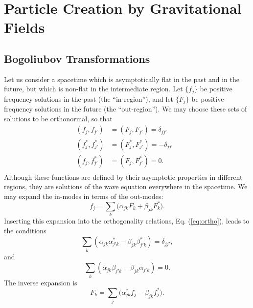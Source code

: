 \documentclass[12pt,onecolumn,eqsecnum,floats,aps,prd,floatfix,titlepage]{revtex4-2}
\begin{document}
\section{Particle Creation by Gravitational Fields}
\label{sec:particle-creation}


\subsection{Bogoliubov Transformations}
\label{sec:Bogoliubov}

    Let us consider a spacetime which is asymptotically flat in the past
and in the future, but which is non-flat in the intermediate region.
Let $\{ f_j \}$ be positive frequency solutions in the past (the 
``in-region''), and let $\{ F_j \}$ be positive frequency solutions in 
the future (the ``out-region'').  We may choose these sets of solutions
to be orthonormal, so that
\begin{equation}
\begin{aligned}
(f_j,f_{j'})&= (F_{j},F_{j'})=\delta _{jj'}& \\
(f_j^*,f_{j'}^*)& = (F_{j}^*,F_{j'}^*)= -\delta _{jj'}& \nonumber \\
(f_j,f_{j'}^*)& = (F_{j},F_{j'}^*)= 0. \\
\end{aligned}
\label{eq:ortho}
\end{equation}
Although these functions are defined by their asymptotic properties in
different regions, they are solutions of the wave equation everywhere
in the spacetime. We may expand the in-modes in terms of the out-modes:
\begin{equation}
f_j=\sum\limits_k {(\alpha _{jk}}F_k + \beta _{jk}F_k^*).
\label{eq:in-out}
\end{equation}
Inserting this expansion into the orthogonality relations, 
Eq. (\ref{eq:ortho}), leads to the conditions
\begin{equation}
\sum\limits_k {(\alpha _{jk}\alpha _{j'k}^*-\beta _{jk}\beta_{j'k}^*)
= \delta _{jj'}}, \label{eq:alphabeta}
\end{equation}
and
\begin{equation}
 \sum\limits_k (\alpha _{jk}\beta _{j'k}-\beta _{jk}\alpha _{j'k})=0.
\end{equation}
The inverse expansion is 
\begin{equation}
F_k=\sum\limits_j {(\alpha _{jk}^*}f_j - \beta _{jk}f_j^*).
\end{equation}
\end{document}
